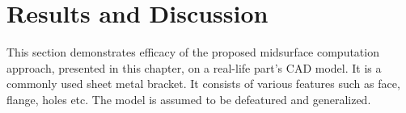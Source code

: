 \section{Results and Discussion}
\label{sec:midsurfcelljoin:results}
%
%

This section demonstrates efficacy of the proposed midsurface computation approach, presented in this chapter, on a real-life part's CAD model. It is a commonly used sheet metal bracket. It consists of various features such as face, flange, holes etc. The model is assumed to be defeatured and generalized. 

